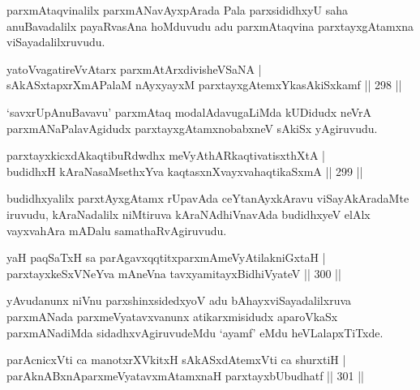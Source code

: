 \begin{artha}
parxmAtaqvinalilx parxmANavAyxpArada Pala parxsididhxyU saha anuBavadalilx payaRvasAna hoMduvudu adu parxmAtaqvina parxtayxgAtamxna viSayadalilxruvudu.
\end{artha}

\begin{shl}
yatoV\s vagatireVvAtarx parxmAtArxdivisheVSaNA | \\
sAkASxtapxrXmAPalaM nAyxyayxM parxtayxgAtemxYkasAkiSxkamf \hfill ||  298 ||  
\end{shl}

\begin{artha}
`savxrUpAnuBavavu' parxmAtaq modalAdavugaLiMda kUDidudx neVrA parxmANaPalavAgidudx parxtayxgAtamxnobabxneV sAkiSx yAgiruvudu.
\end{artha}

\begin{shl}
parxtayxkicxdAkaqtibuRdwdhx meVyAthARkaqtivatisxthXtA | \\
budidhxH kAraNasaMsethxYva kaqtasxnXvayxvahaqtikaSxmA \hfill ||  299 ||  
\end{shl}

\begin{artha}
budidhxyalilx parxtAyxgAtamx rUpavAda ceYtanAyxkAravu viSayAkAradaMte iruvudu, kAraNadalilx niMtiruva kAraNAdhiVnavAda budidhxyeV elAlx vayxvahAra mADalu samathaRvAgiruvudu.
\end{artha}


\begin{shl}
yaH paqSaTxH sa parAgavxqqtitxparxmAmeVyAtilakniGxtaH | \\
parxtayxkeSxVNeYva mAneVna tavxyamitayxBidhiVyateV \hfill ||  300 ||  
\end{shl}

\begin{artha}
yAvudanunx niVnu parxshinxsidedxyoV adu bAhayxviSayadalilxruva parxmANada parxmeVyatavxvanunx atikarxmisidudx aparoVkaSx parxmANadiMda sidadhxvAgiruvudeMdu `ayamf' eMdu heVLalapxTiTxde.
\end{artha}


\begin{shl}
parAcnicxVti ca manotxrXVkitxH sAkASxdAtemxVti ca shurxtiH | \\
parAknABxnAparxmeVyatavxmAtamxnaH parxtayxbUbudhatf \hfill ||  301 ||  
\end{shl}

